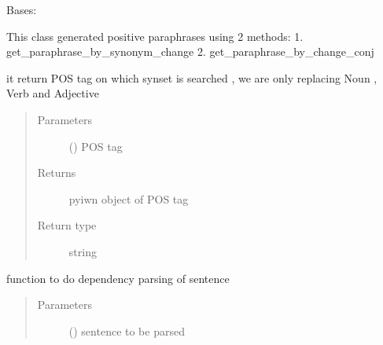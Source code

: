 \documentclass[letterpaper,10pt,english]{sphinxmanual}
\begin{document}
\begin{fulllineitems}
\label{\detokenize{ParaphraseDatasetCreation.Hindi:ParaphraseDatasetCreation.Hindi.Positive.Positive_Paraphrases}}
Bases: 

This class generated positive paraphrases using 2 methods:
1. get\_paraphrase\_by\_synonym\_change
2. get\_paraphrase\_by\_change\_conj

\begin{fulllineitems}
\label{\detokenize{ParaphraseDatasetCreation.Hindi:ParaphraseDatasetCreation.Hindi.Positive.Positive_Paraphrases.find_pos_tag}}
it return POS tag on which synset is searched , we are only replacing Noun , Verb and Adjective
\begin{quote}\begin{description}
\item[{Parameters}] \leavevmode
{} () \textendash{} POS tag

\item[{Returns}] \leavevmode
pyiwn object of POS tag

\item[{Return type}] \leavevmode
string

\end{description}\end{quote}

\end{fulllineitems}


\begin{fulllineitems}
\label{\detokenize{ParaphraseDatasetCreation.Hindi:ParaphraseDatasetCreation.Hindi.Positive.Positive_Paraphrases.get_dep_tree}}
function to do dependency parsing of sentence
\begin{quote}\begin{description}
\item[{Parameters}] \leavevmode
{} () \textendash{} sentence to be parsed


\end{description}
\end{quote}
\end{fulllineitems}
\end{fulllineitems}
\end{document}
